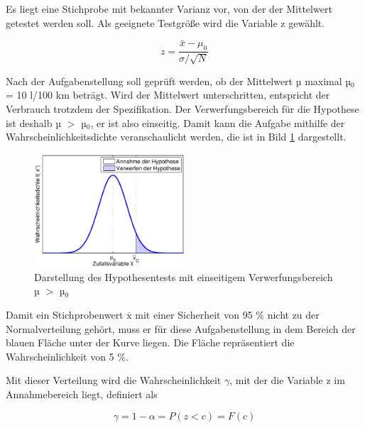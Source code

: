\noindent Es liegt eine Stichprobe mit bekannter Varianz vor, von der der Mittelwert getestet werden soll. Als geeignete Testgr\"{o}{\ss}e wird die Variable z gew\"{a}hlt.

\begin{equation}\label{eq:sixfourteen}
z=\dfrac{\bar{x}-\mu _{0}}{\sigma /\sqrt{N}}
\end{equation}

\noindent Nach der Aufgabenstellung soll gepr\"{u}ft werden, ob der Mittelwert µ maximal µ$_{0}$ = 10 l/100 km betr\"{a}gt. Wird der Mittelwert unterschritten, entspricht der Verbrauch trotzdem der Spezifikation. Der Verwerfungsbereich f\"{u}r die Hypothese ist deshalb µ $\mathrm{>}$ µ$_{0}$, er ist also einseitig. Damit kann die Aufgabe mithilfe der Wahrscheinlichkeitsdichte veranschaulicht werden, die ist in Bild \ref{fig:HypothesentestRechterVerwerfungsbereich} dargestellt.

\clearpage 

\noindent 
\begin{figure}[H]
  \centerline{\includegraphics[width=0.5\textwidth]{Kapitel6/Bilder/image3}}
  \caption{Darstellung des Hypothesentests mit einseitigem Verwerfungsbereich µ $\mathrm{>}$ µ$_{0}$}
  \label{fig:HypothesentestRechterVerwerfungsbereich}
\end{figure}

\noindent Damit ein Stichprobenwert $\overline{\mathrm{x}}$ mit einer Sicherheit von 95 \% nicht zu der Normalverteilung geh\"{o}rt, muss er f\"{u}r diese Aufgabenstellung in dem Bereich der blauen Fl\"{a}che unter der Kurve liegen. Die Fl\"{a}che repr\"{a}sentiert die Wahrscheinlichkeit von 5 \%.\newline

\noindent Mit dieser Verteilung wird die Wahrscheinlichkeit $\gamma$, mit der die Variable z im Annahmebereich liegt, definiert als

\begin{equation}\label{eq:sixfifteen}
\gamma =1-\alpha =P(z<c)=F(c)
\end{equation}

